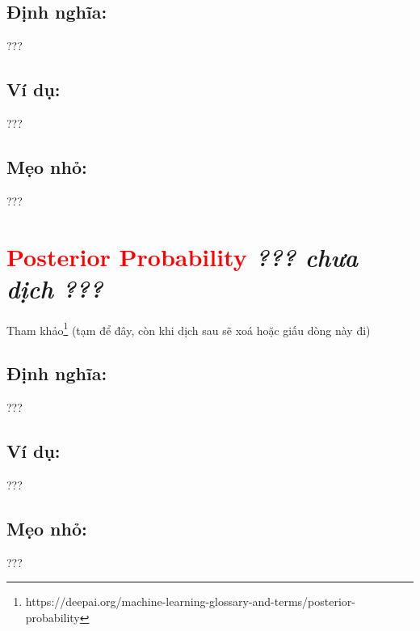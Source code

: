 \subsection*{Định nghĩa:}
???
\subsection*{Ví dụ:}
???
\subsection*{Mẹo nhỏ:}
???
\section*{\huge \textcolor{Red}{Posterior Probability}  \small \textit{??? chưa dịch ???} }
Tham khảo\footnote{https://deepai.org/machine-learning-glossary-and-terms/posterior-probability} (tạm để đây, còn khi dịch sau sẽ xoá hoặc giấu dòng này đi)
\subsection*{Định nghĩa:}
???
\subsection*{Ví dụ:}
???
\subsection*{Mẹo nhỏ:}
???
